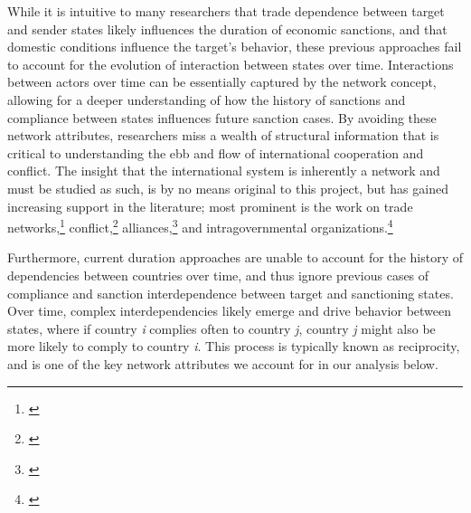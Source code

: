 While it is intuitive to many researchers that trade dependence between target and sender states likely influences the duration of economic sanctions, and that domestic conditions influence the target's behavior, these previous approaches fail to account for the evolution of interaction between states over time. Interactions between actors over time can be essentially captured by the network concept, allowing for a deeper understanding of how the history of sanctions and compliance between states influences future sanction cases. By avoiding these network attributes, researchers miss a wealth of structural information that is critical to understanding the ebb and flow of international cooperation and conflict. The insight that the international system is inherently a network and must be studied as such, is by no means original to this project, but has gained increasing support in the literature; most prominent is the work on trade networks,\footnote{\cite{hoff2004modeling, ward:rainbow:2013}} conflict,\footnote{\cite{AnneAuthor}} alliances,\footnote{\cite{warren2010geometry}} and intragovernmental organizations.\footnote{\cite{cao2009networks,greenhill2010norm}}

Furthermore, current duration approaches are unable to account for the history of dependencies between countries over time, and thus ignore previous cases of compliance and sanction interdependence between target and sanctioning states.  Over time, complex interdependencies likely emerge and drive behavior between states, where if country \textit{i} complies often to country \textit{j}, country \textit{j} might also be more likely to comply to country \textit{i}. This process is typically known as reciprocity, and is one of the key network attributes we account for in our analysis below. 



